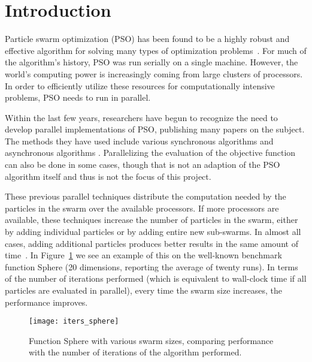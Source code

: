 \documentclass[ms]{byuprop}
\newcommand{\figref}[1]{Figure~\ref{fig:#1}}
\begin{document}

\section{Introduction}
\label{sec:intro}

Particle swarm optimization (PSO) has been found to be a highly robust and
effective algorithm for solving many types of optimization
problems~\citep{poli-2008-pso-applications}.  For much of the algorithm's
history, PSO was run serially on a single machine.  However, the world's
computing power is increasingly coming from large clusters of processors.  In
order to efficiently utilize these resources for computationally intensive
problems, PSO needs to run in parallel.

Within the last few years, researchers have begun to recognize the need to
develop parallel implementations of PSO, publishing many papers on the subject.
The methods they have used include various synchronous algorithms
\citep{chu-2006-intelligent-parallel-pso,jin-2005-pso-antenna-designs,%
parsopoulos-2004-parallel-vector-evaluated-pso,%
schutte-2004-parallel-global-optimization-with-pso} and asynchronous algorithms
\citep{mostaghim-2006-multi-objective-pso-on-grids,%
venter-2005-parallel-pso-asynchronous-evaluations}.  Parallelizing the
evaluation of the objective function can also be done in some cases, though
that is not an adaption of the PSO algorithm itself and thus is not the focus
of this project.

These previous parallel techniques distribute the computation needed by the
particles in the swarm over the available processors.  If more processors are
available, these techniques increase the number of particles in the swarm,
either by adding individual particles or by adding entire new sub-swarms.  In
almost all cases, adding additional particles produces better results in the
same amount of time~\citep{mcnabb-2009-large-particle-swarms}.  In
\figref{iters-sphere} we see an example of this on the well-known benchmark
function Sphere (20 dimensions, reporting the average of twenty runs).  In
terms of the number of iterations performed (which is equivalent to wall-clock
time if all particles are evaluated in parallel), every time the swarm size
increases, the performance improves.

\begin{figure}
  \centering
  \texttt{[image: iters\_sphere]}
  \caption{Function Sphere with various swarm sizes, comparing performance with
  the number of iterations of the algorithm performed.}
  \label{fig:iters-sphere}
\end{figure}
\end{document}
